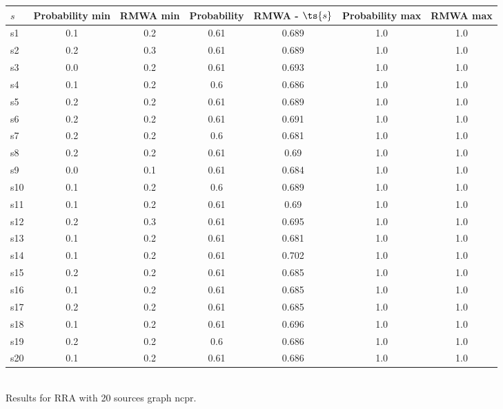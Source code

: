\documentclass{article}
\begin{document}
\noindent\begin{tabular}{|l|c|c|c|c|c|c|}
\hline
$s$& Probability min & RMWA min & Probability & RMWA - $\ts{s}$ & Probability max & RMWA max\\
\hline
s1 &0.1 & 0.2 & 0.61 & 0.689 & 1.0 & 1.0\\
\hline
s2 &0.2 & 0.3 & 0.61 & 0.689 & 1.0 & 1.0\\
\hline
s3 &0.0 & 0.2 & 0.61 & 0.693 & 1.0 & 1.0\\
\hline
s4 &0.1 & 0.2 & 0.6 & 0.686 & 1.0 & 1.0\\
\hline
s5 &0.2 & 0.2 & 0.61 & 0.689 & 1.0 & 1.0\\
\hline
s6 &0.2 & 0.2 & 0.61 & 0.691 & 1.0 & 1.0\\
\hline
s7 &0.2 & 0.2 & 0.6 & 0.681 & 1.0 & 1.0\\
\hline
s8 &0.2 & 0.2 & 0.61 & 0.69 & 1.0 & 1.0\\
\hline
s9 &0.0 & 0.1 & 0.61 & 0.684 & 1.0 & 1.0\\
\hline
s10 &0.1 & 0.2 & 0.6 & 0.689 & 1.0 & 1.0\\
\hline
s11 &0.1 & 0.2 & 0.61 & 0.69 & 1.0 & 1.0\\
\hline
s12 &0.2 & 0.3 & 0.61 & 0.695 & 1.0 & 1.0\\
\hline
s13 &0.1 & 0.2 & 0.61 & 0.681 & 1.0 & 1.0\\
\hline
s14 &0.1 & 0.2 & 0.61 & 0.702 & 1.0 & 1.0\\
\hline
s15 &0.2 & 0.2 & 0.61 & 0.685 & 1.0 & 1.0\\
\hline
s16 &0.1 & 0.2 & 0.61 & 0.685 & 1.0 & 1.0\\
\hline
s17 &0.2 & 0.2 & 0.61 & 0.685 & 1.0 & 1.0\\
\hline
s18 &0.1 & 0.2 & 0.61 & 0.696 & 1.0 & 1.0\\
\hline
s19 &0.2 & 0.2 & 0.6 & 0.686 & 1.0 & 1.0\\
\hline
s20 &0.1 & 0.2 & 0.61 & 0.686 & 1.0 & 1.0\\
\hline
\end{tabular}\\

\noindent Results for RRA with 20 sources graph ncpr.
\end{document}
